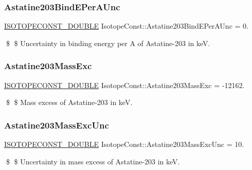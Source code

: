 \subsubsection{\texorpdfstring{Astatine203\+Bind\+E\+Per\+A\+Unc}{Astatine203BindEPerAUnc}}
{\footnotesize\ttfamily \mbox{\hyperlink{group___isotope_const-_macros_ga8f45a7272ce02c0b4c65c44636ed719a}{I\+S\+O\+T\+O\+P\+E\+C\+O\+N\+S\+T\+\_\+\+D\+O\+U\+B\+LE}} Isotope\+Const\+::\+Astatine203\+Bind\+E\+Per\+A\+Unc = 0.}

\$ \$ Uncertainty in binding energy per A of Astatine-\/203 in keV. \mbox{\label{group___isotope_const-_astatine-_at203_ga24d008b333aaf17f91c94a3d686a0605}} 
\subsubsection{\texorpdfstring{Astatine203\+Mass\+Exc}{Astatine203MassExc}}
{\footnotesize\ttfamily \mbox{\hyperlink{group___isotope_const-_macros_ga8f45a7272ce02c0b4c65c44636ed719a}{I\+S\+O\+T\+O\+P\+E\+C\+O\+N\+S\+T\+\_\+\+D\+O\+U\+B\+LE}} Isotope\+Const\+::\+Astatine203\+Mass\+Exc = -\/12162.}

\$ \$ Mass excess of Astatine-\/203 in keV. \mbox{\label{group___isotope_const-_astatine-_at203_gaaacef532c76713d525c1c0f10872739b}} 
\subsubsection{\texorpdfstring{Astatine203\+Mass\+Exc\+Unc}{Astatine203MassExcUnc}}
{\footnotesize\ttfamily \mbox{\hyperlink{group___isotope_const-_macros_ga8f45a7272ce02c0b4c65c44636ed719a}{I\+S\+O\+T\+O\+P\+E\+C\+O\+N\+S\+T\+\_\+\+D\+O\+U\+B\+LE}} Isotope\+Const\+::\+Astatine203\+Mass\+Exc\+Unc = 10.}

\$ \$ Uncertainty in mass excess of Astatine-\/203 in keV. \mbox{\label{group___isotope_const-_astatine-_at203_gadb106d945fa1aecc6e78ee3a0c93c5f9}} 
